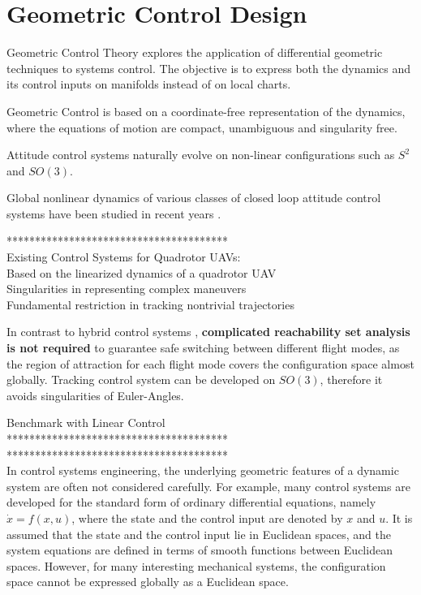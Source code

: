 \chapter{Geometric Control Design} \label{ch:control}

Geometric Control Theory explores the application of differential geometric techniques to systems control. The objective is to express both the dynamics and its control inputs on manifolds instead of on local charts.

Geometric Control is based on a coordinate-free representation of the dynamics, where the equations of motion are compact, unambiguous and singularity free. 

Attitude control systems naturally evolve on non-linear configurations such as $ S^2 $ and $ SO(3) $. 

Global nonlinear dynamics of various classes of closed loop attitude control systems have been studied in recent years \cite{Chaturvedi2011a}.

***************************************\\
Existing Control Systems for Quadrotor UAVs:\\
Based on the linearized dynamics of a quadrotor UAV \\
Singularities in representing complex maneuvers \\
Fundamental restriction in tracking nontrivial trajectories

In contrast to hybrid control systems \cite{Gillula2010}, \textbf{complicated reachability set analysis is not required} to guarantee safe switching between different flight modes, as the region of attraction for each flight mode covers the configuration space almost globally.
Tracking control system can be developed on $ SO(3) $, therefore it avoids singularities of Euler-Angles.

Benchmark with Linear Control\\

***************************************\\


***************************************\\
In control systems engineering, the underlying geometric features of a dynamic system are often not considered carefully. For example, many control systems are developed for the standard form of ordinary differential equations, namely $ \dot{x}=f(x,u) $, where the state and the control input are denoted by $ x $ and $ u $. It is assumed that the state and the control input lie in Euclidean spaces, and the system equations are defined in terms of smooth functions between Euclidean spaces. However, for many interesting mechanical systems, the configuration space cannot be expressed globally as a Euclidean space.


